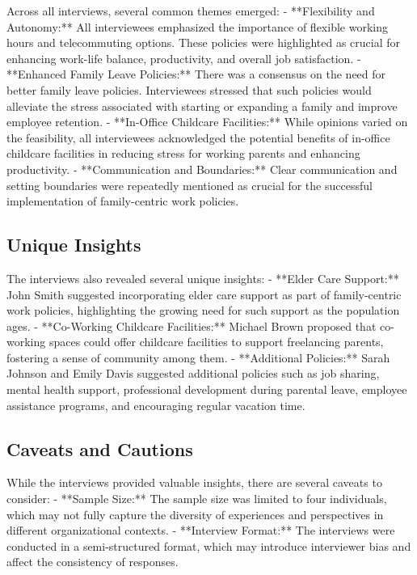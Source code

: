 \documentclass{article} %
\begin{document}
Across all interviews, several common themes emerged:
- **Flexibility and Autonomy:** All interviewees emphasized the importance of flexible working hours and telecommuting options. These policies were highlighted as crucial for enhancing work-life balance, productivity, and overall job satisfaction.
- **Enhanced Family Leave Policies:** There was a consensus on the need for better family leave policies. Interviewees stressed that such policies would alleviate the stress associated with starting or expanding a family and improve employee retention.
- **In-Office Childcare Facilities:** While opinions varied on the feasibility, all interviewees acknowledged the potential benefits of in-office childcare facilities in reducing stress for working parents and enhancing productivity.
- **Communication and Boundaries:** Clear communication and setting boundaries were repeatedly mentioned as crucial for the successful implementation of family-centric work policies.

\subsection{Unique Insights}

The interviews also revealed several unique insights:
- **Elder Care Support:** John Smith suggested incorporating elder care support as part of family-centric work policies, highlighting the growing need for such support as the population ages.
- **Co-Working Childcare Facilities:** Michael Brown proposed that co-working spaces could offer childcare facilities to support freelancing parents, fostering a sense of community among them.
- **Additional Policies:** Sarah Johnson and Emily Davis suggested additional policies such as job sharing, mental health support, professional development during parental leave, employee assistance programs, and encouraging regular vacation time.

\subsection{Caveats and Cautions}

While the interviews provided valuable insights, there are several caveats to consider:
- **Sample Size:** The sample size was limited to four individuals, which may not fully capture the diversity of experiences and perspectives in different organizational contexts.
- **Interview Format:** The interviews were conducted in a semi-structured format, which may introduce interviewer bias and affect the consistency of responses.
\end{document}
